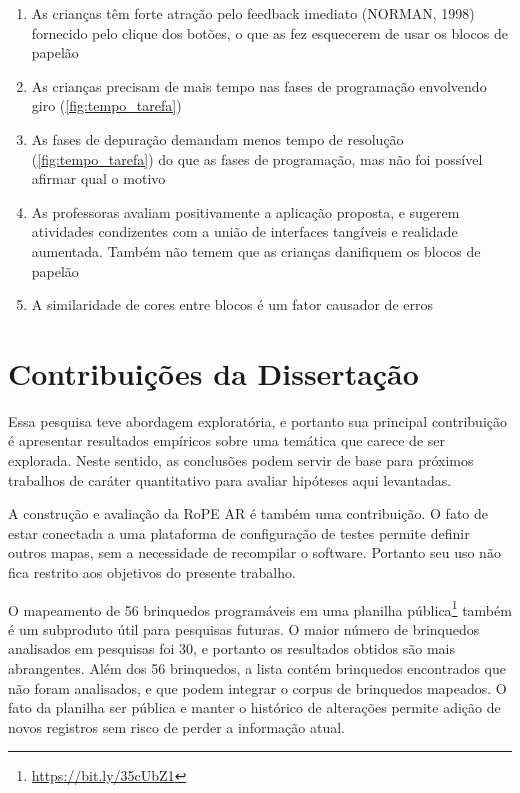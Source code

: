 \begin{enumerate}
    \item As crianças têm forte atração pelo feedback imediato (NORMAN, 1998) fornecido pelo clique dos botões, o que as fez esquecerem de usar os blocos de papelão
    \item As crianças precisam de mais tempo nas fases de programação envolvendo giro (\autoref{fig:tempo_tarefa})
    \item As fases de depuração demandam menos tempo de resolução (\autoref{fig:tempo_tarefa}) do que as fases de programação, mas não foi possível afirmar qual o motivo
    \item As professoras avaliam positivamente a aplicação proposta, e sugerem atividades condizentes com a união de interfaces tangíveis e realidade aumentada. Também não temem que as crianças danifiquem os blocos de papelão
    \item A similaridade de cores entre blocos é um fator causador de erros
\end{enumerate}

\section{Contribuições da Dissertação}
\label{c_conclusao-contribuicao}

Essa pesquisa teve abordagem exploratória, e portanto sua principal contribuição é apresentar resultados empíricos sobre uma temática que carece de ser explorada. Neste sentido, as conclusões podem servir de base para próximos trabalhos de caráter quantitativo para avaliar hipóteses aqui levantadas.

A construção e avaliação da RoPE AR é também uma contribuição. O fato de estar conectada a uma plataforma de configuração de testes permite definir outros mapas, sem a necessidade de recompilar o software. Portanto seu uso não fica restrito aos objetivos do presente trabalho.

O mapeamento de 56 brinquedos programáveis em uma planilha pública\footnote{\url{https://bit.ly/35cUbZ1}} também é um subproduto útil para pesquisas futuras. O maior número de brinquedos analisados em pesquisas \cite{hamilton_emerging_2020,yu_review_2019} foi 30, e portanto os resultados obtidos são mais abrangentes. Além dos 56 brinquedos, a lista contém brinquedos encontrados que não foram analisados, e que podem integrar o corpus de brinquedos mapeados. O fato da planilha ser pública e manter o histórico de alterações permite adição de novos registros sem risco de perder a informação atual.

